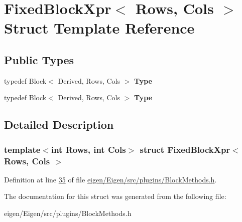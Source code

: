 \hypertarget{struct_fixed_block_xpr}{}\section{Fixed\+Block\+Xpr$<$ Rows, Cols $>$ Struct Template Reference}
\label{struct_fixed_block_xpr}
\subsection*{Public Types}
\begin{DoxyCompactItemize}
\item 
\mbox{\label{struct_fixed_block_xpr_afb4001131b91bbd49660b307ff7aa8fa}} 
typedef Block$<$ Derived, Rows, Cols $>$ {\bfseries Type}
\item 
\mbox{\label{struct_fixed_block_xpr_afb4001131b91bbd49660b307ff7aa8fa}} 
typedef Block$<$ Derived, Rows, Cols $>$ {\bfseries Type}
\end{DoxyCompactItemize}


\subsection{Detailed Description}
\subsubsection*{template$<$int Rows, int Cols$>$\newline
struct Fixed\+Block\+Xpr$<$ Rows, Cols $>$}



Definition at line \hyperlink{eigen_2_eigen_2src_2plugins_2_block_methods_8h_source_l00035}{35} of file \hyperlink{eigen_2_eigen_2src_2plugins_2_block_methods_8h_source}{eigen/\+Eigen/src/plugins/\+Block\+Methods.\+h}.



The documentation for this struct was generated from the following file\+:\begin{DoxyCompactItemize}
\item 
eigen/\+Eigen/src/plugins/\+Block\+Methods.\+h\end{DoxyCompactItemize}
